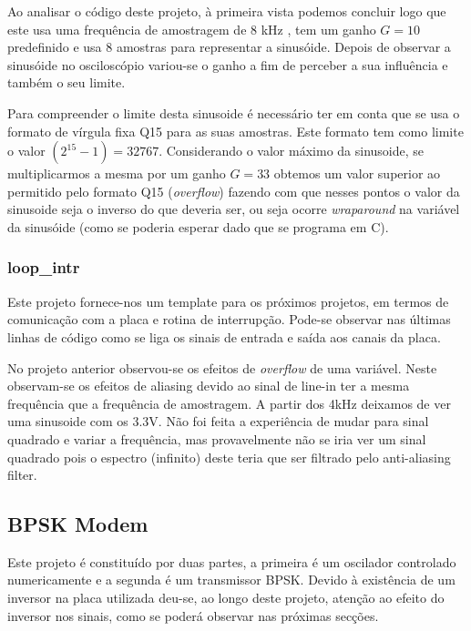 \documentclass[11pt]{article}
\numberwithin{equation}{section}
\begin{document}
Ao analisar o código deste projeto, à primeira vista podemos concluir logo que este usa uma frequência de amostragem de 8 kHz , tem um ganho $G=10$ predefinido e usa 8 amostras para representar a sinusóide. Depois de observar a sinusóide no osciloscópio variou-se o ganho a fim de perceber a sua influência e também o seu limite.
 
Para compreender o limite desta sinusoide é necessário ter em conta que se usa o formato de vírgula fixa Q15 para as suas amostras. Este formato tem como limite o valor $(2^{15}-1) = 32767$. Considerando o valor máximo da sinusoide, se multiplicarmos a mesma por um ganho $G=33$ obtemos um valor superior ao permitido pelo formato Q15 (\textit{overflow}) fazendo com que nesses pontos o valor da sinusoide seja o inverso do que deveria ser, ou seja ocorre \textit{wraparound} na variável da sinusóide (como se poderia esperar dado que se programa em C). 

\subsubsection{loop\_intr}
\label{sec:loop}
Este projeto fornece-nos um template para os próximos projetos, em termos de comunicação com a placa e rotina de interrupção. Pode-se observar nas últimas linhas de código como se liga os sinais de entrada e saída aos canais da placa.

No projeto anterior observou-se os efeitos de \textit{overflow} de uma variável. Neste observam-se os efeitos de aliasing  devido ao sinal de line-in ter a mesma frequência que a frequência de amostragem. A partir dos 4kHz deixamos de ver uma sinusoide com os 3.3V. Não foi feita a experiência de mudar para sinal quadrado e variar a frequência, mas provavelmente não se iria ver um sinal quadrado pois o espectro (infinito) deste teria que ser filtrado pelo anti-aliasing filter. 

\subsection{BPSK Modem}
Este projeto é constituído por duas partes, a primeira é um oscilador controlado numericamente e a segunda é um transmissor BPSK. Devido à existência de um inversor na placa utilizada deu-se, ao longo deste projeto, atenção ao efeito do inversor nos sinais, como se poderá observar nas próximas secções.
\end{document}
